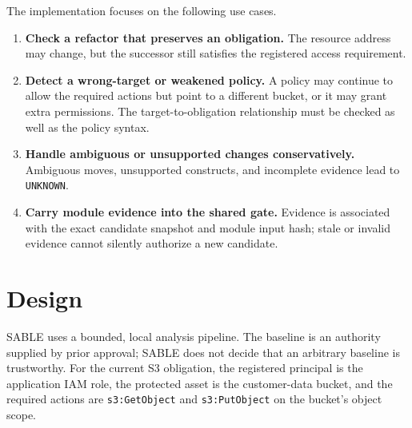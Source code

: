 The implementation focuses on the following use cases.

\begin{enumerate}
    \item \textbf{Check a refactor that preserves an obligation.} The resource address may change, but the successor still satisfies the registered access requirement.
    \item \textbf{Detect a wrong-target or weakened policy.} A policy may continue to allow the required actions but point to a different bucket, or it may grant extra permissions. The target-to-obligation relationship must be checked as well as the policy syntax.
    \item \textbf{Handle ambiguous or unsupported changes conservatively.} Ambiguous moves, unsupported constructs, and incomplete evidence lead to \texttt{UNKNOWN}.
    \item \textbf{Carry module evidence into the shared gate.} Evidence is associated with the exact candidate snapshot and module input hash; stale or invalid evidence cannot silently authorize a new candidate.
\end{enumerate}

\section{Design}

SABLE uses a bounded, local analysis pipeline. The baseline is an authority supplied by prior approval; SABLE does not decide that an arbitrary baseline is trustworthy. For the current S3 obligation, the registered principal is the application IAM role, the protected asset is the customer-data bucket, and the required actions are \texttt{s3:GetObject} and \texttt{s3:PutObject} on the bucket's object scope.

